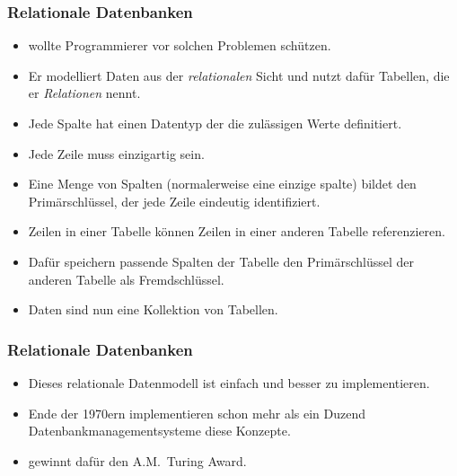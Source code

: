 \documentclass[aspectratio=169,mathserif,notheorems]{beamer}%
\begin{document}
\begin{frame}%
\frametitle{Relationale Datenbanken}%
\begin{itemize}%
\item {} wollte Programmierer vor solchen Problemen schützen.%
\item<2-> Er modelliert Daten aus der \emph{relationalen} Sicht und nutzt dafür Tabellen, die er \emph{Relationen} nennt.%
\item<3-> Jede Spalte hat einen Datentyp der die zulässigen Werte definitiert.%
\item<4-> Jede Zeile muss einzigartig sein.%
\item<5-> Eine Menge von Spalten (normalerweise eine einzige spalte) bildet den Primärschlüssel, der jede Zeile eindeutig identifiziert.%
\item<6-> Zeilen in einer Tabelle können Zeilen in einer anderen Tabelle referenzieren.%
\item<7-> Dafür speichern passende Spalten der Tabelle den Primärschlüssel der anderen Tabelle als Fremdschlüssel.%
\item<8-> Daten sind nun eine Kollektion von Tabellen.%
\end{itemize}%
\end{frame}%
%
\begin{frame}%
\frametitle{Relationale Datenbanken}%
\begin{itemize}%
\item Dieses relationale Datenmodell ist einfach und besser zu implementieren.%
\item<2-> Ende der 1970ern implementieren schon mehr als ein Duzend Datenbankmanagementsysteme diese Konzepte\cite{K1979RDS}.%
\item<3->  gewinnt dafür den A.M.~Turing Award.%
\end{itemize}%
\end{frame}%
%
\end{document}
